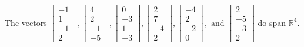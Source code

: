 \begin{exercise}
\begin{exerciseStatement}
  \end{exerciseStatement}
  \begin{exerciseAnswer}
   The vectors \(\left[\begin{array}{r}
-1 \\
1 \\
-1 \\
2
\end{array}\right] , \left[\begin{array}{r}
4 \\
2 \\
-1 \\
-5
\end{array}\right] , \left[\begin{array}{r}
0 \\
-3 \\
1 \\
-3
\end{array}\right] , \left[\begin{array}{r}
2 \\
7 \\
-4 \\
2
\end{array}\right] , \left[\begin{array}{r}
-4 \\
2 \\
-2 \\
0
\end{array}\right] , \text{ and } \left[\begin{array}{r}
2 \\
-5 \\
-3 \\
2
\end{array}\right]\) 
  	 do  
	span \(\mathbb{R}^4\).
  


  \end{exerciseAnswer}
\end{exercise}